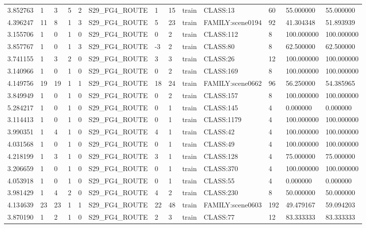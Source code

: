 \begin{tabular}{lllllllllllll}
3.852763 & 1 & 3 & 5 & 2 & S29\_FG4\_ROUTE & 1 & 15 & train & CLASS:13 & 60 & 55.000000 & 55.000000 \\
4.396247 & 11 & 8 & 1 & 3 & S29\_FG4\_ROUTE & 5 & 23 & train & FAMILY:scene0194 & 92 & 41.304348 & 51.893939 \\
3.155706 & 1 & 0 & 1 & 0 & S29\_FG4\_ROUTE & 0 & 2 & train & CLASS:112 & 8 & 100.000000 & 100.000000 \\
3.857767 & 1 & 0 & 1 & 3 & S29\_FG4\_ROUTE & -3 & 2 & train & CLASS:80 & 8 & 62.500000 & 62.500000 \\
3.741155 & 1 & 3 & 2 & 0 & S29\_FG4\_ROUTE & 3 & 3 & train & CLASS:26 & 12 & 100.000000 & 100.000000 \\
3.140966 & 1 & 0 & 1 & 0 & S29\_FG4\_ROUTE & 0 & 2 & train & CLASS:169 & 8 & 100.000000 & 100.000000 \\
4.149756 & 19 & 19 & 1 & 1 & S29\_FG4\_ROUTE & 18 & 24 & train & FAMILY:scene0662 & 96 & 56.250000 & 54.385965 \\
3.849949 & 1 & 0 & 1 & 0 & S29\_FG4\_ROUTE & 0 & 2 & train & CLASS:157 & 8 & 100.000000 & 100.000000 \\
5.284217 & 1 & 0 & 1 & 0 & S29\_FG4\_ROUTE & 0 & 1 & train & CLASS:145 & 4 & 0.000000 & 0.000000 \\
3.114413 & 1 & 0 & 1 & 0 & S29\_FG4\_ROUTE & 0 & 1 & train & CLASS:1179 & 4 & 100.000000 & 100.000000 \\
3.990351 & 1 & 4 & 1 & 0 & S29\_FG4\_ROUTE & 4 & 1 & train & CLASS:42 & 4 & 100.000000 & 100.000000 \\
4.031568 & 1 & 0 & 1 & 0 & S29\_FG4\_ROUTE & 0 & 1 & train & CLASS:49 & 4 & 100.000000 & 100.000000 \\
4.218199 & 1 & 3 & 1 & 0 & S29\_FG4\_ROUTE & 3 & 1 & train & CLASS:128 & 4 & 75.000000 & 75.000000 \\
3.206659 & 1 & 0 & 1 & 0 & S29\_FG4\_ROUTE & 0 & 1 & train & CLASS:370 & 4 & 100.000000 & 100.000000 \\
4.053918 & 1 & 0 & 1 & 0 & S29\_FG4\_ROUTE & 0 & 1 & train & CLASS:55 & 4 & 0.000000 & 0.000000 \\
3.981429 & 1 & 4 & 2 & 0 & S29\_FG4\_ROUTE & 4 & 2 & train & CLASS:230 & 8 & 50.000000 & 50.000000 \\
4.134639 & 23 & 23 & 1 & 1 & S29\_FG4\_ROUTE & 22 & 48 & train & FAMILY:scene0603 & 192 & 49.479167 & 59.094203 \\
3.870190 & 1 & 2 & 1 & 0 & S29\_FG4\_ROUTE & 2 & 3 & train & CLASS:77 & 12 & 83.333333 & 83.333333 \\

\end{tabular}
